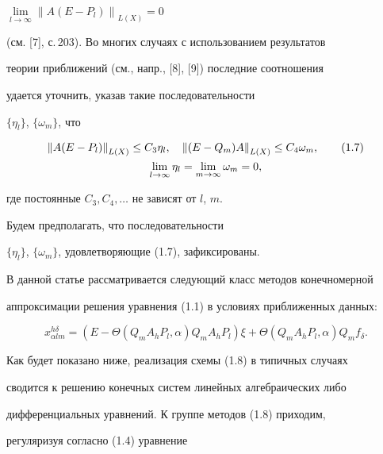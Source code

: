 $\lim \limits_{l \to \infty} {\| A(E- P_l) \|}_{ L(X)} =0$


(см. [7], с.\,203). Во многих случаях с использованием результатов


теории приближений (см., напр., [8], [9]) последние соотношения


удается уточнить, указав такие последовательности


$\{ \eta_l \}$, $\{ \omega_m \}$, что


\begin{gather}


{\| A(E- P_l) \|}_{ L(X)} \leq C_3 \eta_l, \quad


{\| (E- Q_m)A \|}_{ L(X)} \leq C_4 \omega_m, \tag{1.7} \\


%


\lim \limits_{l \to \infty} \eta_l=


\lim \limits_{m \to \infty} \omega_m =0,\notag


\end{gather}


где постоянные $C_3,C_4,\dotsc$ не зависят от $l$, $m$.


Будем предполагать, что последовательности


$\{ \eta_l \}$, $\{ \omega_m \}$, удовлетворяющие (1.7), зафиксированы.





В данной статье рассматривается следующий класс методов конечномерной


аппроксимации решения уравнения (1.1) в условиях приближенных данных:


\begin{equation}


x_{\alpha l m}^{h \delta}=(E-\Theta(Q_m A_h P_l, \alpha) Q_m A_h P_l)


\xi + \Theta(Q_m A_h P_l, \alpha) Q_m f_{\delta}.


\tag{1.8}


\end{equation}


Как будет показано ниже, реализация схемы (1.8) в типичных случаях


сводится к решению конечных систем линейных алгебраических либо


дифференциальных уравнений. К группе методов (1.8) приходим,


регуляризуя согласно (1.4) уравнение


$$


